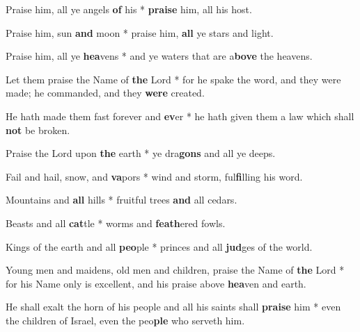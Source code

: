 \begin{multicols}{2}
	Praise him, all ye angels \textbf{of} his * \textbf{praise} him, all his host.
	
	Praise him, sun \textbf{and} moon * praise him, \textbf{all} ye stars and light.
	
	Praise him, all ye \textbf{hea}vens * and ye waters that are a\textbf{bove} the heavens.
	
	Let them praise the Name of \textbf{the} Lord * for he spake the word, and they were made; he commanded, and they \textbf{were} created.
	
	He hath made them fast forever and \textbf{ev}er * he hath given them a law which shall \textbf{not} be broken.
	
	Praise the Lord upon \textbf{the} earth * ye dra\textbf{gons} and all ye deeps.
	
	Fail and hail, snow, and \textbf{va}pors * wind and storm, ful\textbf{fi}lling his word.
	
	Mountains and \textbf{all} hills * fruitful trees \textbf{and} all cedars.
	
	Beasts and all \textbf{cat}tle * worms and \textbf{feath}ered fowls.
	
	Kings of the earth and all \textbf{peo}ple * princes and all \textbf{jud}ges of the world.
	
	Young men and maidens, old men and children, praise the Name of \textbf{the} Lord * for his Name only is excellent, and his praise above \textbf{hea}ven and earth.
	
	He shall exalt the horn of his people and all his saints shall \textbf{praise} him * even the children of Israel, even the peo\textbf{ple} who serveth him.
\end{multicols}